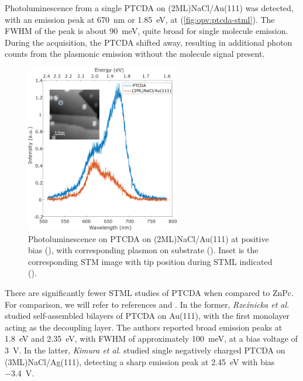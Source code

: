 Photoluminescence from a single PTCDA on (2ML)NaCl/Au(111) was detected, with an emission peak at \SI{670}{nm} or \SI{1.85}{eV}, at  (\autoref{fig:opv:ptcda-stml}). The \ac{FWHM} of the peak is about \SI{90}{meV}, quite broad for single molecule emission. During the acquisition, the PTCDA shifted away, resulting in additional photon counts from the plasmonic emission without the molecule signal present.


\begin{figure} [H]
    \centering
        \includegraphics[width=0.6\textwidth]{pictures/ptcda_+ve_emission_inset.png}
    \caption{Photoluminescence on PTCDA on (2ML)NaCl/Au(111) at positive bias (), with corresponding plasmon on substrate (). Inset is the corresponding STM image with tip position during STML indicated (). }
    \label{fig:opv:ptcda-stml}
\end{figure}

There are significantly fewer \ac{STML} studies of PTCDA when compared to ZnPc. For comparison, we will refer to references \citep{Rzeznicka2011} and \citep{Kimura2019}. In the former, \textit{Rze\'znicka et al.} studied self-assembled bilayers of PTCDA on Au(111), with the first monolayer acting as the decoupling layer. The authors reported broad emission peaks at \SI{1.8}{eV} and \SI{2.35}{eV}, with FWHM of approximately \SI{100}{meV}, at a bias voltage of \SI{3}{V}. In the latter, \textit{Kimura et al.} studied single negatively charged PTCDA on (3ML)NaCl/Ag(111), detecting a sharp emission peak at \SI{2.45}{eV} with bias \SI{-3.4}{V}. 


